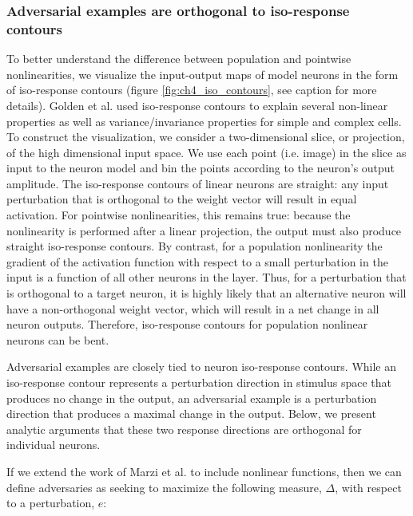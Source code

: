 \subsubsection{Adversarial examples are orthogonal to iso-response contours}
To better understand the difference between population and pointwise nonlinearities, we visualize the input-output maps of model neurons in the form of iso-response contours (figure \ref{fig:ch4_iso_contours}, see caption for more details). Golden et al. \citeyearpar{golden2016conjectures} used iso-response contours to explain several non-linear properties as well as variance/invariance properties for simple and complex cells. To construct the visualization, we consider a two-dimensional slice, or projection, of the high dimensional input space. We use each point (i.e. image) in the slice as input to the neuron model and bin the points according to the neuron's output amplitude. The iso-response contours of linear neurons are straight: any input perturbation that is orthogonal to the weight vector will result in equal activation. For pointwise nonlinearities, this remains true: because the nonlinearity is performed after a linear projection, the output must also produce straight iso-response contours. By contrast, for a population nonlinearity the gradient of the activation function with respect to a small perturbation in the input is a function of all other neurons in the layer. Thus, for a perturbation that is orthogonal to a target neuron, it is highly likely that an alternative neuron will have a non-orthogonal weight vector, which will result in a net change in all neuron outputs. Therefore, iso-response contours for population nonlinear neurons can be bent.

Adversarial examples are closely tied to neuron iso-response contours. While an iso-response contour represents a perturbation direction in stimulus space that produces no change in the output, an adversarial example is a perturbation direction that produces a maximal change in the output. Below, we present analytic arguments that these two response directions are orthogonal for individual neurons.

If we extend the work of Marzi et al. \citeyearpar{marzi2018sparsity} to include nonlinear functions, then we can define adversaries as seeking to maximize the following measure, $\Delta$, with respect to a perturbation, $e$:

